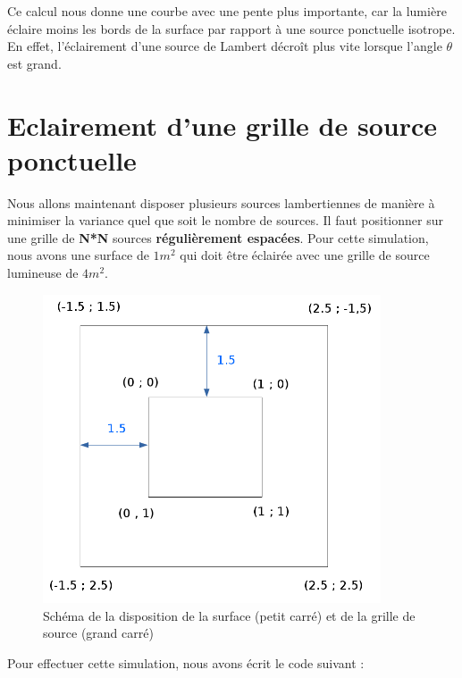 \documentclass[a4paper,11pt]{article}
\begin{document}
  Ce calcul nous donne une courbe avec une pente plus importante, car la lumière éclaire moins les 
  bords de la surface par rapport à une source ponctuelle isotrope. En effet, l'éclairement d'une 
  source de Lambert décroît plus vite lorsque l'angle $\theta$ est grand.
  
  \section{Eclairement d'une grille de source ponctuelle}
  
  Nous allons maintenant disposer plusieurs sources lambertiennes de manière à minimiser la
  variance quel que soit le nombre de sources. Il faut positionner sur une grille de \textbf{N*N}
  sources \textbf{régulièrement espacées}. Pour cette simulation, nous avons une surface de $1m^{2}$
  qui doit être éclairée avec une grille de source lumineuse de $4m^{2}$.\\
  
  \begin{figure}[H]
    \center
    \includegraphics[width=10cm]{../schema.png}
    \caption{Schéma de la disposition de la surface (petit carré) et de la grille de source (grand carré)}
  \end{figure}
  
  Pour effectuer cette simulation, nous avons écrit le code suivant :\\
  
\end{document}
